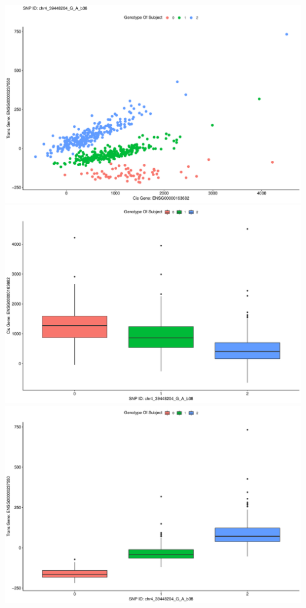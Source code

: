 \documentclass[
]{article}
\begin{document}
\includegraphics{12_15_2021_GMAC_plots_all_trios_files/figure-latex/unnamed-chunk-8-1.pdf}
\includegraphics{12_15_2021_GMAC_plots_all_trios_files/figure-latex/unnamed-chunk-8-2.pdf}
\includegraphics{12_15_2021_GMAC_plots_all_trios_files/figure-latex/unnamed-chunk-8-3.pdf}
\end{document}
